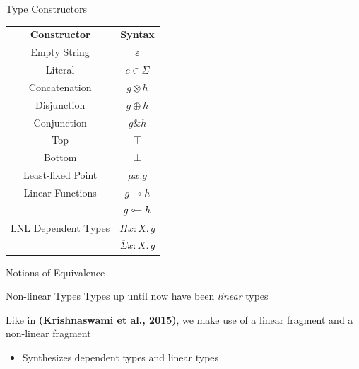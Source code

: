 \documentclass[10pt]{beamer}
\makeatletter
\newif\ifdraft
\newcommand{\todoin}[1]{\ifdraft{\todo[inline]{TODO:\@ #1}}\fi}
\newcommand{\lto}{\multimap}
\newcommand{\tol}{\mathrel{\rotatebox[origin=c]{180}{$\lto$}}}
\newcommand{\LinPiTy}[3]{\overline\Pi #1 : #2.\, #3}
\newcommand{\LinSigTy}[3]{\overline\Sigma #1 : #2.\, #3}
\newcommand{\amp}{\mathrel{\&}}
\makeatother
\begin{document}
\begin{frame}{Type Constructors}
  \begin{center}
  \begin{tabular}{c c}
    \textbf{Constructor} & \textbf{Syntax} \\
    Empty String & $\varepsilon$ \\
    Literal & $c \in \Sigma$ \\
    Concatenation & $g \otimes h$ \\
    Disjunction & $g \oplus h$ \\
    Conjunction & $g \amp h$ \\
    Top & $\top$ \\
    Bottom & $\bot$ \\
    Least-fixed Point & $\mu x . g$ \\
    Linear Functions & $g \lto h$ \\
     & $g \tol h$ \\
    LNL Dependent Types & $\LinPiTy {x} {X} {g}$ \\
    & $\LinSigTy {x} {X} {g}$
  \end{tabular}
  \end{center}
\end{frame}

\begin{frame}{Notions of Equivalence}
  \todoin{the induced notion of isomorphism is strong equivalence}
  \todoin{logical equivalence is weak equivalence}
\end{frame}

\begin{frame}{Non-linear Types}
  Types up until now have been \emph{linear} types

  Like in \textbf{(Krishnaswami et al., 2015)}, we make use of a linear fragment and a non-linear fragment
  \begin{itemize}
    \item Synthesizes dependent types and linear types
  \end{itemize}

\end{frame}
\end{document}
